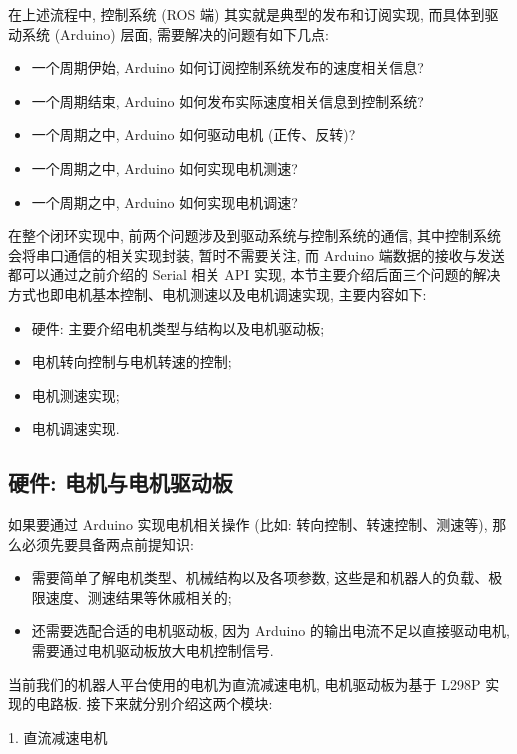 \documentclass[openany, fontset=windowsold]{ctexbook}
\theoremstyle{kaiti}
\theoremstyle{normal}
\begin{document}
在上述流程中, 控制系统 (ROS 端) 其实就是典型的发布和订阅实现, 而具体到驱动系统 (Arduino) 层面, 需要解决的问题有如下几点:

\begin{itemize}
  \item 一个周期伊始, Arduino 如何订阅控制系统发布的速度相关信息? 
  \item 一个周期结束, Arduino 如何发布实际速度相关信息到控制系统? 
  \item 一个周期之中, Arduino 如何驱动电机 (正传、反转)? 
  \item 一个周期之中, Arduino 如何实现电机测速? 
  \item 一个周期之中, Arduino 如何实现电机调速? 
\end{itemize}

在整个闭环实现中, 前两个问题涉及到驱动系统与控制系统的通信, 其中控制系统会将串口通信的相关实现封装, 暂时不需要关注, 而 Arduino 端数据的接收与发送都可以通过之前介绍的 Serial 相关 API 实现, 本节主要介绍后面三个问题的解决方式也即电机基本控制、电机测速以及电机调速实现, 主要内容如下:

\begin{itemize}
  \item 硬件: 主要介绍电机类型与结构以及电机驱动板; 
  \item 电机转向控制与电机转速的控制; 
  \item 电机测速实现; 
  \item 电机调速实现.
\end{itemize}

\subsection{硬件: 电机与电机驱动板}

如果要通过 Arduino 实现电机相关操作 (比如: 转向控制、转速控制、测速等), 那么必须先要具备两点前提知识:

\begin{itemize}
  \item 需要简单了解电机类型、机械结构以及各项参数, 这些是和机器人的负载、极限速度、测速结果等休戚相关的; 
  \item 还需要选配合适的电机驱动板, 因为 Arduino 的输出电流不足以直接驱动电机, 需要通过电机驱动板放大电机控制信号.
\end{itemize}

当前我们的机器人平台使用的电机为直流减速电机, 电机驱动板为基于 L298P 实现的电路板. 接下来就分别介绍这两个模块:

1. 直流减速电机
\end{document}
